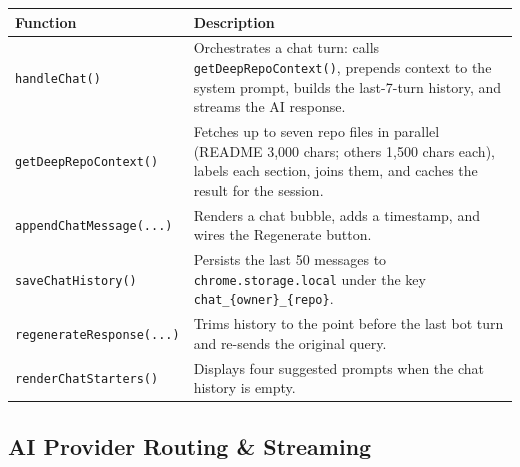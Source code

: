 \documentclass[11pt,a4paper]{article}
\begin{document}
\begin{longtable}{L{5.2cm} L{8.3cm}}
    \toprule
    \textbf{Function} & \textbf{Description} \\
    \midrule
    \endhead
    \bottomrule
    \endfoot

    \texttt{handleChat()} &
        Orchestrates a chat turn: calls \texttt{getDeepRepoContext()}, prepends context to the system prompt, builds the last-7-turn history, and streams the AI response. \\
    \addlinespace

    \texttt{getDeepRepoContext()} &
        Fetches up to seven repo files in parallel (README 3,000 chars; others 1,500 chars each), labels each section, joins them, and caches the result for the session. \\
    \addlinespace

    \texttt{appendChatMessage(...)} &
        Renders a chat bubble, adds a timestamp, and wires the Regenerate button. \\
    \addlinespace

    \texttt{saveChatHistory()} &
        Persists the last 50 messages to \texttt{chrome.storage.local} under the key \texttt{chat\_\{owner\}\_\{repo\}}. \\
    \addlinespace

    \texttt{regenerateResponse(...)} &
        Trims history to the point before the last bot turn and re-sends the original query. \\
    \addlinespace

    \texttt{renderChatStarters()} &
        Displays four suggested prompts when the chat history is empty. \\
\end{longtable}

\subsection{AI Provider Routing \& Streaming}
\end{document}
